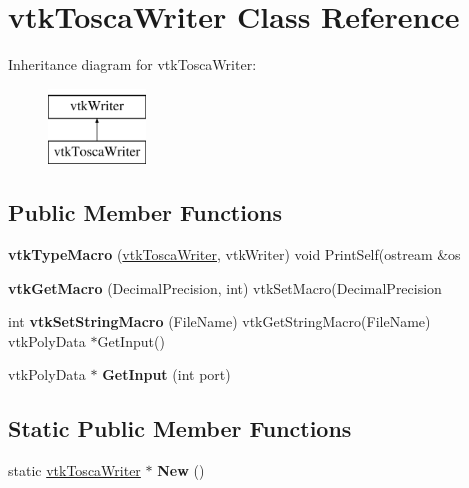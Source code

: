 \hypertarget{classvtk_tosca_writer}{}\section{vtk\+Tosca\+Writer Class Reference}
\label{classvtk_tosca_writer}
Inheritance diagram for vtk\+Tosca\+Writer\+:\begin{figure}[H]
\begin{center}
\leavevmode
\includegraphics[height=2.000000cm]{classvtk_tosca_writer}
\end{center}
\end{figure}
\subsection*{Public Member Functions}
\begin{DoxyCompactItemize}
\item 
\hypertarget{classvtk_tosca_writer_a0a47348acdf2f5f49d3f3c2e9dde580f}{}{\bfseries vtk\+Type\+Macro} (\hyperlink{classvtk_tosca_writer}{vtk\+Tosca\+Writer}, vtk\+Writer) void Print\+Self(ostream \&os\label{classvtk_tosca_writer_a0a47348acdf2f5f49d3f3c2e9dde580f}

\item 
\hypertarget{classvtk_tosca_writer_ac43ad340ea103c97c8c4d17b531edb72}{}{\bfseries vtk\+Get\+Macro} (Decimal\+Precision, int) vtk\+Set\+Macro(Decimal\+Precision\label{classvtk_tosca_writer_ac43ad340ea103c97c8c4d17b531edb72}

\item 
\hypertarget{classvtk_tosca_writer_a7e9f6f4b14241fea70bfaf53d5bdca1d}{}int {\bfseries vtk\+Set\+String\+Macro} (File\+Name) vtk\+Get\+String\+Macro(File\+Name) vtk\+Poly\+Data $\ast$Get\+Input()\label{classvtk_tosca_writer_a7e9f6f4b14241fea70bfaf53d5bdca1d}

\item 
\hypertarget{classvtk_tosca_writer_a0249e2f9da7c5534d402d9ef84d95465}{}vtk\+Poly\+Data $\ast$ {\bfseries Get\+Input} (int port)\label{classvtk_tosca_writer_a0249e2f9da7c5534d402d9ef84d95465}

\end{DoxyCompactItemize}
\subsection*{Static Public Member Functions}
\begin{DoxyCompactItemize}
\item 
\hypertarget{classvtk_tosca_writer_a5953b17b40af129c7b58904e878564d9}{}static \hyperlink{classvtk_tosca_writer}{vtk\+Tosca\+Writer} $\ast$ {\bfseries New} ()\label{classvtk_tosca_writer_a5953b17b40af129c7b58904e878564d9}

\end{DoxyCompactItemize}

